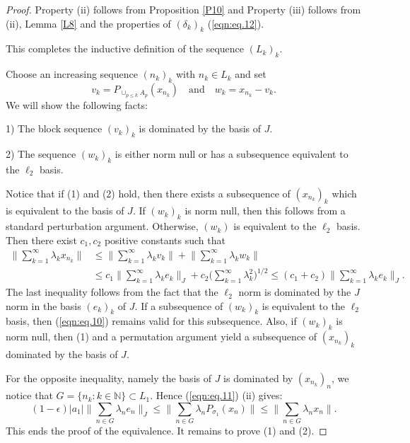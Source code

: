 \documentclass[10pt,a4paper]{amsart}
\newcommand{\N}{\mathbb{N}}
\newcommand{\s}{\sigma}
\begin{document}
\begin{proof}
Property (ii) follows from Proposition \ref{P10} and Property (iii) follows from (ii), Lemma \ref{L8} and the properties of $(\delta_k)_k$ (\ref{eqn:eq.12}).

This completes the inductive definition of the sequence $(L_k)_k$.

Choose an increasing sequence $(n_k)_k$ with $n_k\in L_k$ and set
\[ v_k = P_{\cup_{p\leq k} A_p}(x_{n_k}) \quad \text{and} \quad w_k = x_{n_k} - v_k. \]
We will show the following facts:

1) The block sequence $(v_k)_k$ is dominated by the basis of $J$.

2) The sequence $(w_k)_k$ is either norm null or has a subsequence equivalent to the $\ell_2$ basis.

Notice that if (1) and (2) hold, then there exists a subsequence of $(x_{n_k})_k$ which is equivalent to the basis of $J$. If $(w_k)_k$ is norm null, then this follows from a standard perturbation argument. 
Otherwise, $(w_k)$ is equivalent to the $\ell_2$ basis. Then there exist $c_1, c_2$ positive constants such that
\begin{equation}\label{eqn:eq.10}
\begin{split}
\Big\|\sum_{k=1}^\infty\lambda_k x_{n_k} \Big\| &\leq \Big\| \sum_{k=1}^\infty\lambda_k v_k \Big\| + \Big\| \sum_{k=1}^\infty\lambda_k w_k \Big\| \\
&\leq c_1 \Big\| \sum_{k=1}^\infty\lambda_k e_k \Big\|_J + c_2\Big( \sum_{k=1}^\infty\lambda_k^2 \Big)^{1/2} \leq (c_1+c_2)\Big\| \sum_{k=1}^\infty\lambda_k e_k \Big\|_J.
\end{split}
\end{equation}
The last inequality follows from the fact  that the $\ell_2$ norm is dominated by the $J$ norm in the basis $(e_k)_k$ of $J$. If a subsequence of $(w_k)_k$ is equivalent to the $\ell_2$ basis, then (\ref{eqn:eq.10}) remains valid for this subsequence. Also, if $(w_k)_k$ is norm null, then (1) and a permutation argument yield a subsequence of $(x_{n_k})_k$ dominated by the basis of $J$.

For the opposite inequality, namely the basis of $J$ is dominated by $(x_{n_k})_n$, we notice that $G = \{n_k : k\in\N\} \subset L_1$. Hence (\ref{eqn:eq.11}) (ii) gives:
\[ (1-\epsilon) |a_1| \Big\| \sum_{n\in G}\lambda_ne_n \Big\|_J \leq \Big\| \sum_{n\in G} \lambda_nP_{\s_1}(x_n) \Big\| \leq \Big\| \sum_{n\in G} \lambda_nx_n \Big\|. \]
This ends the proof of the equivalence. It remains to prove (1) and (2).


\end{proof}
\end{document}
